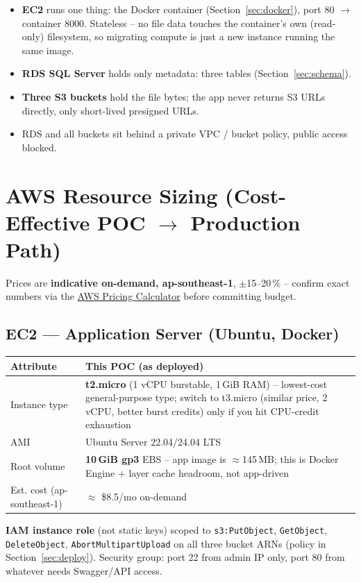 \documentclass[10pt]{article}
\begin{document}
\begin{itemize}
  \item \textbf{EC2} runs one thing: the Docker container (Section~\ref{sec:docker}), port 80 $\to$ container 8000. Stateless -- no file data touches the container's own (read-only) filesystem, so migrating compute is just a new instance running the same image.
  \item \textbf{RDS SQL Server} holds only metadata: three tables (Section~\ref{sec:schema}).
  \item \textbf{Three S3 buckets} hold the file bytes; the app never returns S3 URLs directly, only short-lived presigned URLs.
  \item RDS and all buckets sit behind a private VPC / bucket policy, public access blocked.
\end{itemize}

\section[AWS Resource Sizing]{AWS Resource Sizing (Cost-Effective POC $\to$ Production Path)}

\begin{warnbox}
Prices are \textbf{indicative on-demand, ap-southeast-1}, $\pm$15--20\,\% --
confirm exact numbers via the \href{https://calculator.aws/}{AWS Pricing Calculator} before committing budget.
\end{warnbox}

\subsection{EC2 --- Application Server (Ubuntu, Docker)}

\noindent \begin{tabularx}{\textwidth}{@{}l X@{}}
\toprule
\rowcolor{tableHead} \textbf{Attribute} & \textbf{This POC (as deployed)} \\
\midrule
Instance type & \textbf{t2.micro} (1 vCPU burstable, 1\,GiB RAM) -- lowest-cost general-purpose type; switch to t3.micro (similar price, 2 vCPU, better burst credits) only if you hit CPU-credit exhaustion \\
\rowcolor{tableAlt} AMI & Ubuntu Server 22.04/24.04 LTS \\
Root volume & \textbf{10\,GiB gp3} EBS -- app image is $\approx$145\,MB; this is Docker Engine + layer cache headroom, not app-driven \\
\rowcolor{tableAlt} Est. cost (ap-southeast-1) & $\approx$ \$8.5/mo on-demand \\
\bottomrule
\end{tabularx}
\textbf{IAM instance role} (not static keys) scoped to \texttt{s3:PutObject},
\texttt{GetObject}, \texttt{DeleteObject}, \texttt{AbortMultipartUpload} on
all three bucket ARNs (policy in Section~\ref{sec:deploy}). Security group:
port 22 from admin IP only, port 80 from whatever needs Swagger/API access.
\end{document}
